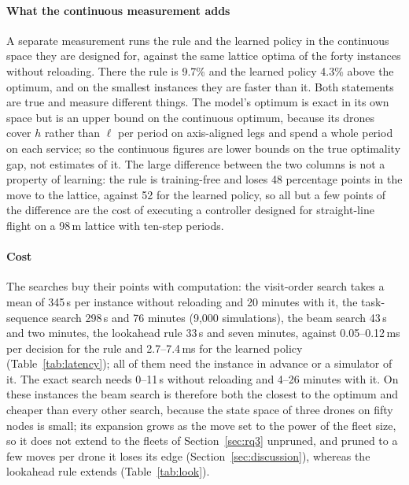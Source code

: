 \documentclass[final,5p,times,twocolumn]{elsarticle}
\begin{document}
\paragraph{What the continuous measurement adds}
A separate measurement runs the rule and the learned policy in the continuous space they are
designed for, against the same lattice optima of the forty instances without reloading. There the
rule is 9.7\% and the learned policy 4.3\% above the optimum, and on the smallest instances they
are faster than it. Both statements are true and measure different things. The model's optimum is exact in
its own space but is an upper bound on the continuous optimum, because its drones cover $h$
rather than $\ell$ per period on axis-aligned legs and spend a whole period on each service; so
the continuous figures are lower bounds on the true optimality gap, not estimates of it. The
large difference between the two columns is not a property of learning: the rule is training-free
and loses 48 percentage points in the move to the lattice, against 52 for the learned policy, so
all but a few points of the difference are the cost of executing a controller designed for
straight-line flight on a 98\,m lattice with ten-step periods.

\paragraph{Cost}
The searches buy their points with computation: the visit-order search takes a mean of
345\,s per instance without reloading and 20 minutes with it, the task-sequence search 298\,s
and 76 minutes (9{,}000 simulations), the beam search 43\,s and two minutes, the lookahead
rule 33\,s and seven minutes, against 0.05--0.12\,ms per decision for the rule and
2.7--7.4\,ms for the learned policy (Table~\ref{tab:latency}); all of them need the instance in
advance or a simulator of it. The exact search needs 0--11\,s without reloading and 4--26 minutes
with it. On these instances the beam search is therefore both the closest to the optimum and
cheaper than every other search, because the state space of three drones on fifty nodes is small;
its expansion grows as the move set to the power of the fleet size, so it does not extend to the
fleets of Section~\ref{sec:rq3} unpruned, and pruned to a few moves per drone it loses its edge
(Section~\ref{sec:discussion}), whereas the lookahead rule extends (Table~\ref{tab:look}).
\end{document}
